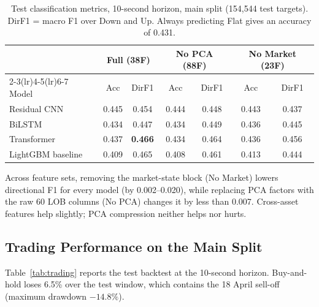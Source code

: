 \begin{table}[htbp]
\centering
\caption{Test classification metrics, 10-second horizon, main split
(154,544 test targets). DirF1 = macro F1 over Down and Up. Always predicting Flat
gives an accuracy of 0.431.}
\label{tab:classification}
\begin{tabular}{lcccccc}
\toprule
 & \multicolumn{2}{c}{Full (38F)} & \multicolumn{2}{c}{No PCA (88F)} & \multicolumn{2}{c}{No Market (23F)} \\
\cmidrule(lr){2-3}\cmidrule(lr){4-5}\cmidrule(lr){6-7}
Model & Acc & DirF1 & Acc & DirF1 & Acc & DirF1 \\
\midrule
Residual CNN      & 0.445 & 0.454 & 0.444 & 0.448 & 0.443 & 0.437 \\
BiLSTM            & 0.434 & 0.447 & 0.434 & 0.449 & 0.436 & 0.445 \\
Transformer       & 0.437 & \textbf{0.466} & 0.434 & 0.464 & 0.436 & 0.456 \\
LightGBM baseline & 0.409 & 0.465 & 0.408 & 0.461 & 0.413 & 0.444 \\
\bottomrule
\end{tabular}
\end{table}

Across feature sets, removing the market-state block (No Market) lowers directional F1
for every model (by 0.002--0.020), while replacing PCA factors with the raw 60 LOB
columns (No PCA) changes it by less than 0.007. Cross-asset features help slightly; PCA
compression neither helps nor hurts.

\subsection{Trading Performance on the Main Split}
\label{sec:trading}

Table~\ref{tab:trading} reports the test backtest at the 10-second horizon. Buy-and-hold
loses 6.5\% over the test window, which contains the 18 April sell-off (maximum drawdown
$-14.8\%$).

